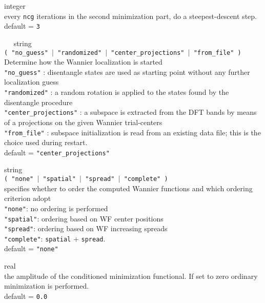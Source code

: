 {\noindent{}%
{\sc integer} \\ every {\tt ncg} iterations in the second minimization part, 
do a steepest-descent step.\\ {\sc default} = {\tt 3 }\par

\noindent{}%
{\sc $\quad$ string} \\  
{\tt ( "no\_guess" $\mid$ "randomized" $\mid$ "center\_projections" 
$\mid$ "from\_file" )}\\
 Determine how the Wannier localization is started\\
{\tt "no\_guess"} : disentangle states are used as starting point
                 without any further localization guess\\
{\tt "randomized"} : a random rotation is applied to the states found by
                 the disentangle procedure\\
{\tt "center\_projections"} : a subspace is extracted from the DFT bands
                 by means of a projections on the given Wannier trial-centers \\
{\tt "from\_file"} : subspace initialization is read from an existing data file;
                 this is the choice used during restart. \\
{\sc default} = {\tt "center\_projections"} \par

\noindent{}%
{\sc string} \\ {\tt ( "none" $\mid$ "spatial" $\mid$ "spread" $\mid$ "complete" ) } \\
specifies whether to order the computed Wannier functions and
              which ordering criterion adopt\\
{\tt "none"}:      no ordering is performed\\
{\tt "spatial"}:   ordering based on WF center positions\\
{\tt "spread"}:    ordering based on WF increasing spreads\\
{\tt "complete"}:  {\tt spatial} + {\tt spread}. \\
{\sc default} = {\tt "none" }\par

\noindent{}%
{\sc real} \\ the amplitude of the conditioned minimization functional. If set to zero
              ordinary minimization is performed.\\ 
{\sc default} = {\tt 0.0} \par

}
